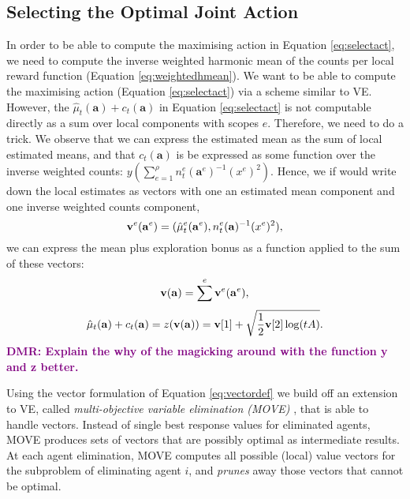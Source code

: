 \documentclass{article}
\newcommand{\est}{\hat{\mu}}
\newcommand{\dmr}[1]{\textcolor{purple}{\bf DMR: #1}}
\begin{document}
\subsection{Selecting the Optimal Joint Action}\label{sec:selectalg}
In order to be able to compute the maximising action in Equation \ref{eq:selectact}, we need to compute the inverse weighted harmonic mean of the counts per local reward function (Equation \ref{eq:weightedhmean}). We want to be able to compute the maximising action (Equation \ref{eq:selectact}) via a scheme similar to VE. However, the $\est_t(\mathbf{a}) + c_t(\mathbf{a})$ in Equation \ref{eq:selectact} is not computable directly as a sum over local components with scopes $e$. Therefore, we need to do a trick. We observe that we can express the estimated mean as the sum of local estimated means, and that $c_t(\mathbf{a})$ is be expressed as some function over the inverse weighted counts: $y(\sum_{e=1}^\rho n^e_t(\mathbf{a}^e)^{-1} (x^e)^2)$. Hence, we if would write down the local estimates as vectors with one an estimated mean component and one inverse weighted counts component, 
\begin{equation}\label{eq:vectordef}
 {\bf v}^e({\bf a}^e) =   (\est^e_t(\mathbf{a}^e), n^e_t(\mathbf{a})^{-1} (x^e)^2), 
\end{equation}
we can express the mean plus exploration bonus as a function applied to the sum of these vectors:
\begin{equation}\label{eq:vectorsum}
 {\bf v}({\bf a}) = \sum^e  {\bf v}^e({\bf a}^e), 
 \end{equation}
\begin{equation}\label{eq:zfunction}
\est_t(\mathbf{a}) + c_t(\mathbf{a}) = z( {\bf v}({\bf a})) = {\bf v}[1] + \sqrt{ \frac{1}{2}  {\bf v}[2] \log ( t A )} .
\end{equation}
\dmr{Explain the why of the magicking around with the function y and z better.}

Using the vector formulation of Equation \ref{eq:vectordef} we build off an extension to VE, called \emph{multi-objective variable elimination (MOVE)} \cite{Rollon06MOBE,roijers2015computing,roijersPhD}, that is able to handle vectors. Instead of single best response values for eliminated agents, MOVE produces sets of vectors that are possibly optimal as intermediate results. At each agent elimination, MOVE computes all possible (local) value vectors for the subproblem of eliminating agent $i$, and \emph{prunes} away those vectors that cannot be optimal.  
\end{document}
